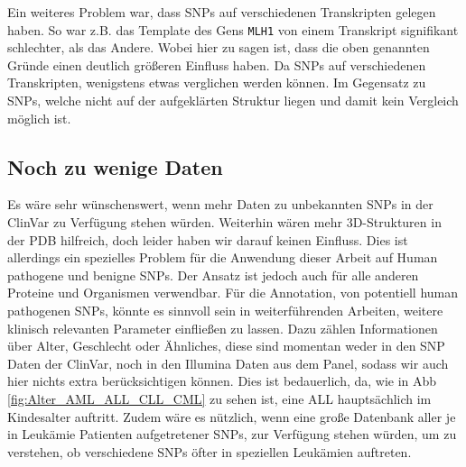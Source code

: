 Ein weiteres Problem war, dass \ac{SNP}s auf verschiedenen Transkripten gelegen haben. So war z.B. das Template des Gens \texttt{MLH1} von einem Transkript signifikant schlechter, als das Andere. Wobei hier zu sagen ist, dass die oben genannten Gründe einen deutlich größeren Einfluss haben. Da \ac{SNP}s auf verschiedenen Transkripten, wenigstens etwas verglichen werden können. Im Gegensatz zu \ac{SNP}s, welche nicht auf der aufgeklärten Struktur liegen und damit kein Vergleich möglich ist.


\subsection{Noch zu wenige Daten}
Es wäre sehr wünschenswert, wenn mehr Daten zu unbekannten \ac{SNP}s in der ClinVar zu Verfügung stehen würden. Weiterhin wären mehr 3D-Strukturen in der \ac{PDB} hilfreich, doch leider haben wir darauf keinen Einfluss. Dies ist allerdings ein spezielles Problem für die Anwendung dieser Arbeit auf Human pathogene und benigne \ac{SNP}s. Der Ansatz ist jedoch auch für alle anderen Proteine und Organismen verwendbar. Für die Annotation, von potentiell human pathogenen \ac{SNP}s, könnte es sinnvoll sein in weiterführenden Arbeiten, weitere klinisch relevanten Parameter einfließen zu lassen. Dazu zählen Informationen über Alter, Geschlecht oder Ähnliches, diese sind momentan weder in den SNP Daten der ClinVar, noch in den Illumina Daten aus dem Panel, sodass wir auch hier nichts extra berücksichtigen können. Dies ist bedauerlich, da, wie in \ac{Abb} \ref{fig:Alter_AML_ALL_CLL_CML} zu sehen ist, eine \ac{ALL} hauptsächlich im Kindesalter auftritt. Zudem wäre es nützlich, wenn eine große Datenbank aller je in Leukämie Patienten aufgetretener \ac{SNP}s, zur Verfügung stehen würden, um zu verstehen, ob verschiedene \ac{SNP}s öfter in speziellen Leukämien auftreten. 

